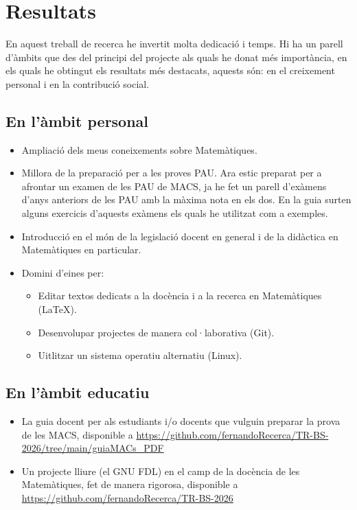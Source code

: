 \chapter{Resultats}

En aquest treball de recerca he invertit molta dedicació i temps. Hi ha un parell d'àmbits que des del principi del projecte als quals he donat més importància, en els quals he obtingut els resultats més destacats, aquests són: en el creixement personal i en la contribució social.

\section{En l'àmbit personal}
\begin{itemize}
 \item Ampliació dels meus coneixements sobre Matemàtiques.
 \item Millora de la preparació per a les proves PAU. Ara estic preparat per a afrontar un examen de les PAU de MACS, ja he fet un parell d'exàmens d'anys anteriors de les PAU amb la màxima nota en els dos. En la guia surten alguns exercicis d'aquests exàmens els quals he utilitzat com a exemples.
 \item Introducció en el món de la legislació docent en general i de la didàctica en Matemàtiques en particular.
 \item Domini d'eines per:
  \begin{itemize}
   \item Editar textos dedicats a la docència i a la recerca en Matemàtiques (\LaTeX).
   \item Desenvolupar projectes de manera col·laborativa (Git).
   \item Uitlitzar un sistema operatiu alternatiu (Linux).
  \end{itemize}
\end{itemize}

\section{En l'àmbit educatiu}
\begin{itemize}
 \item La guia docent per als estudiants i/o docents que vulguin preparar la prova de les MACS, disponible a \url{https://github.com/fernandoRecerca/TR-BS-2026/tree/main/guiaMACs_PDF}
 \item Un projecte lliure (el GNU FDL) en el camp de la docència de les Matemàtiques, fet de manera rigorosa, disponible a \url{https://github.com/fernandoRecerca/TR-BS-2026}
\end{itemize}



%
%
%
%

